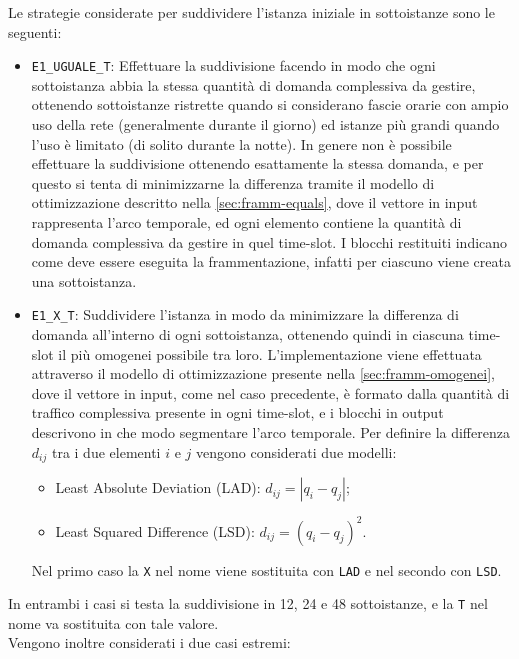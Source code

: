 Le strategie considerate per suddividere l'istanza iniziale in sottoistanze sono le seguenti:
\begin{itemize}
    \item \texttt{E1\_UGUALE\_T}: Effettuare la suddivisione facendo in modo che ogni sottoistanza abbia la stessa quantità di domanda complessiva da gestire, ottenendo sottoistanze ristrette quando si considerano fascie orarie con ampio uso della rete (generalmente durante il giorno) ed istanze più grandi quando l'uso è limitato (di solito durante la notte). In genere non è possibile effettuare la suddivisione ottenendo esattamente la stessa domanda, e per questo si tenta di minimizzarne la differenza tramite il modello di ottimizzazione descritto nella \autoref{sec:framm-equals}, dove il vettore in input rappresenta l'arco temporale, ed ogni elemento contiene la quantità di domanda complessiva da gestire in quel time-slot. I blocchi restituiti indicano come deve essere eseguita la frammentazione, infatti per ciascuno viene creata una sottoistanza.

    \item \texttt{E1\_X\_T}: Suddividere l'istanza in modo da minimizzare la differenza di domanda all'interno di ogni sottoistanza, ottenendo quindi in ciascuna time-slot il più omogenei possibile tra loro. L'implementazione viene effettuata attraverso il modello di ottimizzazione presente nella \autoref{sec:framm-omogenei}, dove il vettore in input, come nel caso precedente, è formato dalla quantità di traffico complessiva presente in ogni time-slot, e i blocchi in output descrivono in che modo segmentare l'arco temporale. Per definire la differenza $d_{ij}$ tra i due elementi $i$ e $j$ vengono considerati due modelli:
    \begin{itemize}
        \item Least Absolute Deviation (LAD): $d_{ij} = |q_i - q_j|$;
        \item Least Squared Difference (LSD): $d_{ij} = (q_i - q_j)^2$.
    \end{itemize}
    Nel primo caso la \texttt{X} nel nome viene sostituita con \texttt{LAD} e nel secondo con \texttt{LSD}.
\end{itemize}
In entrambi i casi si testa la suddivisione in 12, 24 e 48 sottoistanze, e la \texttt{T} nel nome va sostituita con tale valore.\\
Vengono inoltre considerati i due casi estremi:
